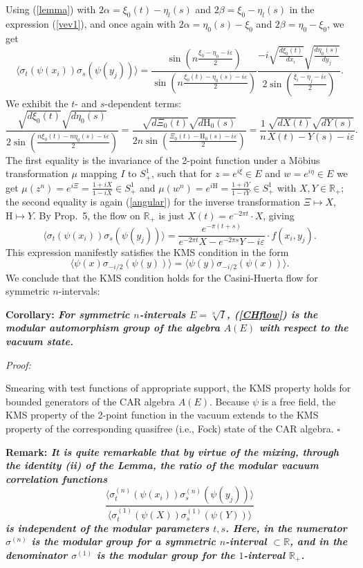 \documentclass[12pt]{article}
\def\eps{\varepsilon}
\def \RR {{\mathbb R}}
\def\be{\begin{equation}} \def\bea{\begin{eqnarray}}
\def\ee{\end{equation}}\def\ea{\end{array}}
\def \QED {\hspace*{\fill}$\square$\medskip}
\newcommand{\dd}[2]{\frac{d{#2}}{d{#1}}}
\begin{document}
Using (\ref{lemma}) with $2\alpha=\xi_0(t)-\eta_l(s)$ and
$2\beta=\xi_0-\eta_l(s)$ in the expression (\ref{vev1}), and once again
with $2\alpha=\eta_0(s)-\xi_0$ and
$2\beta=\eta_0-\xi_0$, we get 
\be
\label{vev2} 
  \langle\sigma_t(\psi(x_i))\sigma_s(\psi(y_j))\rangle
  =\frac{\sin(n\frac {\xi_0-\eta_0-i\eps}2)}
  {\sin(n\frac{\xi_0(t)-\eta_0(s)-i\eps}2)}\frac
  {-i\sqrt{\dd{x_i}{\xi_0(t)}}\sqrt{\dd{y_j}{\eta_0(s)}}} 
  {2\sin(\frac{\xi_i-\eta_j-i\eps}2)}.
\ee
We exhibit the $t$- and $s$-dependent terms:
\be
  \frac{\sqrt{d\xi_0(t)}\sqrt{d\eta_0(s)}} 
       {2\sin(\frac {n\xi_0(t)-n\eta_0(s)-i\eps}2)} = 
  \frac{\sqrt{d\Xi_0(t)}\sqrt{d\mathrm{H}_0(s)}} 
       {2n\sin(\frac {\Xi_0(t)-\mathrm{H}_0(s)-i\eps}2)} = 
  \frac 1n \frac {\sqrt {dX(t)}\sqrt{dY(s)}} {X(t)-Y(s)-i\eps}. 
\ee
The first equality is the invariance of the 2-point function under a
Möbius transformation $\mu$ mapping $I$ to $S^1_+$, such that for
$z=e^{i\xi}\in E$ and $w=e^{i\eta}\in E$ we get $\mu(z^n) =
e^{i\Xi}=\frac{1+iX}{1-iX}\in S^1_+$ and $\mu(w^n) =e^{i\mathrm{H}} = 
\frac{1+iY}{1-iY}\in S^1_+$ with $X,Y\in\RR_+$; the second equality 
is again (\ref{angular}) for the inverse transformation
$\Xi\mapsto X$, $\mathrm{H}\mapsto Y$. By Prop.\ 5, the flow on
$\RR_+$ is just $X(t)=e^{-2\pi t}\cdot X$, giving
\be 
\label{vev3}
  \langle\sigma_t(\psi(x_i))\sigma_s(\psi(y_j))\rangle =  
  \frac {e^{-\pi (t+s)}}{e^{-2\pi t}X-e^{-2\pi s}Y-i\eps}\cdot
  f(x_i,y_j).
\ee
This expression manifestly satisfies the KMS condition in the form 
\be 
\label{kms}
   \langle\psi(x)\sigma_{-i/2}(\psi(y))\rangle = 
   \langle\psi(y)\sigma_{-i/2}(\psi(x))\rangle.
\ee
We conclude that
the KMS condition holds for the Casini-Huerta flow for symmetric
$n$-intervals: 

\medskip

{\bf Corollary: \sl For symmetric $n$-intervals $E=\sqrt[n]I$,
  (\ref{CHflow}) is the modular automorphism group of the algebra
  $A(E)$ with respect to the vacuum state. 

\medskip

\it Proof:} Smearing with test functions of appropriate support, the
KMS property holds for bounded generators of the CAR algebra $A(E)$. 
Because $\psi$ is a free field, the KMS property of the 2-point
function in the vacuum extends to the KMS property of the
corresponding quasifree (i.e., Fock) state of the CAR algebra. \QED 

\medskip

{\bf Remark: \sl It is quite remarkable that by virtue of the mixing,
  through the identity (ii) of the Lemma, the ratio of the modular
  vacuum correlation functions
\be
  \frac{\langle\sigma^{(n)}_t(\psi(x_i))\sigma^{(n)}_s(\psi(y_j))\rangle}
  {\langle\sigma^{(1)}_t(\psi(X))\sigma^{(1)}_s(\psi(Y))\rangle}
\ee
is independent of the modular parameters $t,s$. Here, in the
numerator $\sigma^{(n)}$ is the modular group for a symmetric
$n$-interval $\subset \RR$, and in the denominator $\sigma^{(1)}$ is
the modular group for the $1$-interval $\RR_+$.}
\end{document}
